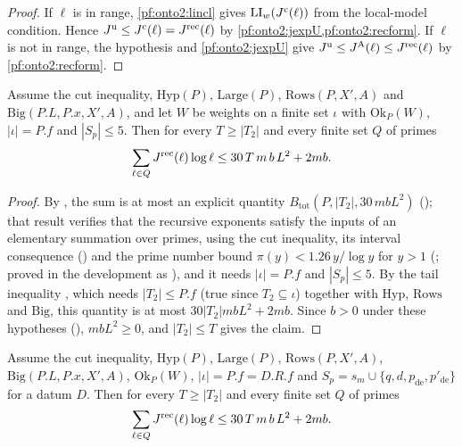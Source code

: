 \begin{proof}
If $\ell$ is in range, \cref{pf:onto2:lincl} gives $\mathrm{LI}_w(J^{\mathrm c}(\ell))$ from the local-model condition.
Hence $J^{\mathrm{u}}\le J^{\mathrm c}(\ell)=J^{\mathrm{rec}}(\ell)$ by \cref{pf:onto2:jexpU,pf:onto2:recform}. If $\ell$ is not in range, the
hypothesis and \cref{pf:onto2:jexpU} give $J^{\mathrm{u}}\le J^{\mathrm{A}}(\ell)\le J^{\mathrm{rec}}(\ell)$ by \cref{pf:onto2:recform}.
\end{proof}

\begin{lemma}\label{pf:onto2:sumcut}
Assume the cut inequality, $\mathrm{Hyp}(P)$, $\mathrm{Large}(P)$, $\mathrm{Rows}(P,X',A)$ and $\mathrm{Big}(P.L,P.x,X',A)$, and let $W$ be
weights on a finite set $\iota$ with $\mathrm{Ok}_P(W)$, $|\iota|=P.f$ and $|S_p|\le5$. Then for every $T\ge|T_2|$ and every finite set
$Q$ of primes
\[
\sum_{\ell\in Q}J^{\mathrm{rec}}(\ell)\log\ell\le30\,T\,m\,b\,L^2+2mb .
\]
\end{lemma}

\begin{proof}
By , the sum is at most an explicit quantity
$B_{\mathrm{tot}}(P,|T_2|,30\,mbL^2)$ (); that result verifies
that the recursive exponents satisfy the inputs of an elementary summation over primes, using the cut inequality, its interval
consequence () and the prime number bound $\pi(y)<1.26\,y/\log y$ for
$y>1$ (\cite[Cor.~1]{RosserSchoenfeld1962}; proved in the development as
), and it needs $|\iota|=P.f$ and $|S_p|\le5$. By the tail inequality
, which needs $|T_2|\le P.f$ (true since
$T_2\subseteq\iota$) together with $\mathrm{Hyp}$, $\mathrm{Rows}$ and $\mathrm{Big}$, this quantity is at most $30|T_2|mbL^2+2mb$. Since
$b>0$ under these hypotheses (),
$mbL^2\ge0$, and $|T_2|\le T$ gives the claim.
\end{proof}

\begin{proposition}\label{pf:onto2:sumlog}
Assume the cut inequality, $\mathrm{Hyp}(P)$, $\mathrm{Large}(P)$, $\mathrm{Rows}(P,X',A)$, $\mathrm{Big}(P.L,P.x,X',A)$, $\mathrm{Ok}_P(W)$,
$|\iota|=P.f=D.R.f$ and $S_p=s_m\cup\{q,d,p_{\mathrm{de}},p'_{\mathrm{de}}\}$ for a datum $D$. Then for every $T\ge|T_2|$ and every finite
set $Q$ of primes
\[
\sum_{\ell\in Q}J^{\mathrm{rec}}(\ell)\log\ell\le30\,T\,m\,b\,L^2+2mb .
\]
\end{proposition}

